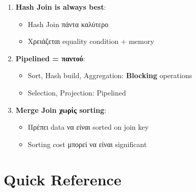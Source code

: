 \begin{warningbox}
\begin{enumerate}
    \item \textbf{Hash Join is always best}:
    \begin{itemize}
        \item[$\times$] Hash Join πάντα καλύτερο
        \item[\checkmark] Χρειάζεται equality condition + memory
    \end{itemize}

    \item \textbf{Pipelined = παντού}:
    \begin{itemize}
        \item Sort, Hash build, Aggregation: \textbf{Blocking} operations
        \item Selection, Projection: Pipelined
    \end{itemize}

    \item \textbf{Merge Join χωρίς sorting}:
    \begin{itemize}
        \item Πρέπει data να είναι sorted on join key
        \item Sorting cost μπορεί να είναι significant
    \end{itemize}
\end{enumerate}
\end{warningbox}

\section{Quick Reference}

